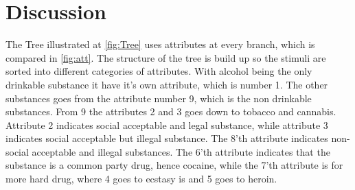 \section{Discussion}
\label{Discussion}
The Tree illustrated at \autoref{fig:Tree} uses attributes at every branch, which is compared in \autoref{fig:att}. 
The structure of the tree is build up so the stimuli are sorted into different categories of attributes. 
With alcohol being the only drinkable substance it have it's own attribute, which is number 1. The other substances goes from the attribute number 9, which is the non drinkable substances. From 9 the attributes 2 and 3 goes down to tobacco and cannabis. Attribute 2 indicates social acceptable and legal substance, while attribute 3 indicates social acceptable but illegal substance. The 8'th attribute indicates non-social acceptable and illegal substances. The 6'th attribute indicates that the substance is a common party drug, hence cocaine, while the 7'th attribute is for more hard drug, where 4 goes to ecstasy is and 5 goes to heroin.  